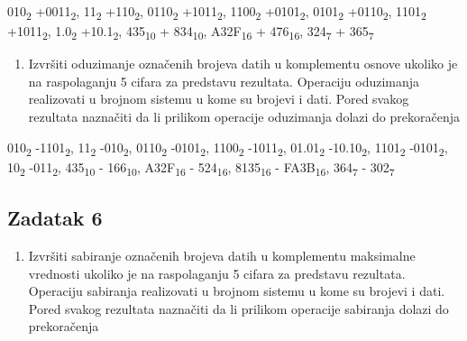 \documentclass[a4paper,11pt]{article}
\numberwithin{equation}{section}
\begin{document}
010\textsubscript{2} +0011\textsubscript{2}, 11\textsubscript{2} +110\textsubscript{2}, 0110\textsubscript{2} +1011\textsubscript{2}, 1100\textsubscript{2} +0101\textsubscript{2}, 0101\textsubscript{2} +0110\textsubscript{2}, 1101\textsubscript{2} +1011\textsubscript{2}, 1.0\textsubscript{2} +10.1\textsubscript{2}, 435\textsubscript{10} + 834\textsubscript{10}, A32F\textsubscript{16} + 476\textsubscript{16}, 324\textsubscript{7} + 365\textsubscript{7}



\begin{enumerate}[label=\alph*),start=2,leftmargin=*]
\item Izvršiti oduzimanje označenih brojeva datih u komplementu osnove ukoliko je na raspolaganju 5 cifara za predstavu rezultata. Operaciju oduzimanja realizovati u brojnom sistemu u kome su brojevi i dati. Pored svakog rezultata naznačiti da li prilikom operacije oduzimanja dolazi do prekoračenja

\end{enumerate}


010\textsubscript{2} -1101\textsubscript{2}, 11\textsubscript{2} -010\textsubscript{2}, 0110\textsubscript{2} -0101\textsubscript{2}, 1100\textsubscript{2} -1011\textsubscript{2}, 01.01\textsubscript{2} -10.10\textsubscript{2}, 1101\textsubscript{2} -0101\textsubscript{2}, 10\textsubscript{2} -011\textsubscript{2}, 435\textsubscript{10} - 166\textsubscript{10}, A32F\textsubscript{16} - 524\textsubscript{16}, 8135\textsubscript{16} - FA3B\textsubscript{16}, 364\textsubscript{7} - 302\textsubscript{7}



\FloatBarrier
\subsection{Zadatak 6}\label{sec:3.6}


\begin{enumerate}[label=\alph*),start=1,leftmargin=*]
\item Izvršiti sabiranje označenih brojeva datih u komplementu maksimalne vrednosti ukoliko je na raspolaganju 5 cifara za predstavu rezultata. Operaciju sabiranja realizovati u brojnom sistemu u kome su brojevi i dati. Pored svakog rezultata naznačiti da li prilikom operacije sabiranja dolazi do prekoračenja

\end{enumerate}
\end{document}
